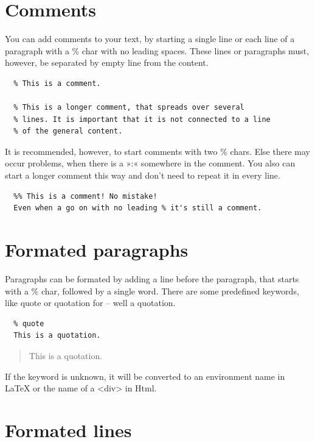 \documentclass{article}
\begin{document}
\section{Comments}

You can add comments to your text, by starting a single line
or each line of a paragraph with a \% char with no leading
spaces. These lines or paragraphs must, however, be
separated by empty line from the content.

\begin{verbatim}
  % This is a comment.

  % This is a longer comment, that spreads over several
  % lines. It is important that it is not connected to a line
  % of the general content.

\end{verbatim}

It is recommended, however, to start comments with two \% chars.
Else there may occur problems, when there is a »:« somewhere
in the comment. You also can start a longer comment this way
and don't need to repeat it in every line.

\begin{verbatim}
  %% This is a comment! No mistake!
  Even when a go on with no leading % it's still a comment.

\end{verbatim}

\section{Formated paragraphs}

Paragraphs can be formated by adding a line before the
paragraph, that starts with a \% char, followed by a single
word. There are some predefined keywords, like quote or
quotation for – well a quotation.

\begin{verbatim}
  % quote
  This is a quotation.

\end{verbatim}

\begin{quote}
This is a quotation.

\end{quote}

If the keyword is unknown, it will be converted to an environment
name in LaTeX or the name of a <div> in Html.

\section{Formated lines}
\end{document}
